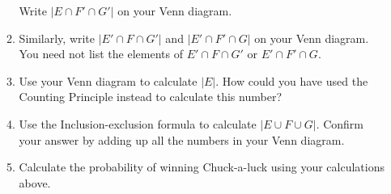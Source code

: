 \documentclass[12pt]{article}
\begin{document}
\begin{enumerate}
\begin{enumerate}
Write $\left|E\cap F'\cap G'\right|$ on your Venn diagram.
\vspace{2in}
\item Similarly, write
$\left|E'\cap F\cap G'\right|$
and $\left|E'\cap F'\cap G\right|$ on 
your Venn diagram. You need not list the elements of
$E'\cap F\cap G'$ or $E'\cap F'\cap G$.
\item Use your Venn diagram to calculate
$\left|E\right|$. How could you have used
the Counting Principle instead to calculate this number?
\vspace{1in}
\item Use the Inclusion-exclusion formula
to calculate $\left|E\cup F\cup G\right|$.
Confirm your answer by adding up all the numbers
in your Venn diagram.
\vspace{1in}
\item Calculate the probability of winning
Chuck-a-luck using your calculations above.
\end{enumerate}
\end{enumerate}
\end{document}
